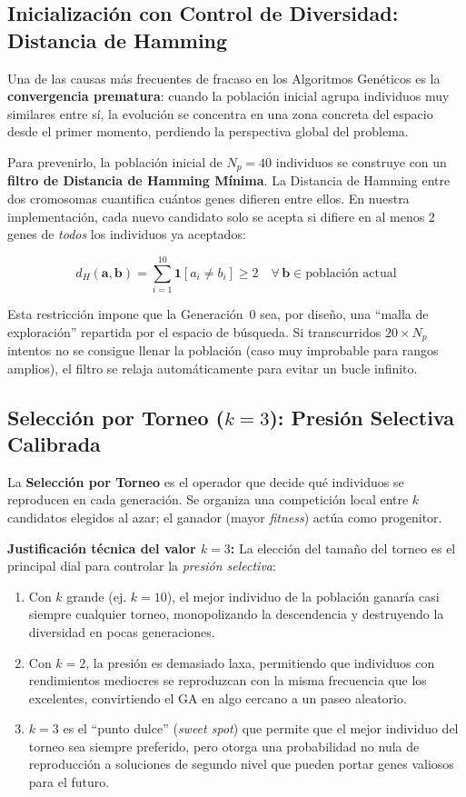 \documentclass[12pt, a4paper]{article}
\begin{document}
\subsection{Inicialización con Control de Diversidad: Distancia de Hamming}

Una de las causas más frecuentes de fracaso en los Algoritmos Genéticos es la
\textbf{convergencia prematura}: cuando la población inicial agrupa individuos muy
similares entre sí, la evolución se concentra en una zona concreta del espacio
desde el primer momento, perdiendo la perspectiva global del problema.

Para prevenirlo, la población inicial de $N_p = 40$ individuos se construye con un
\textbf{filtro de Distancia de Hamming Mínima}. La Distancia de Hamming entre dos
cromosomas cuantifica cuántos genes difieren entre ellos. En nuestra implementación,
cada nuevo candidato solo se acepta si difiere en al menos 2 genes de
\textit{todos} los individuos ya aceptados:

\begin{equation}
  d_H(\mathbf{a}, \mathbf{b}) = \sum_{i=1}^{10} \mathbf{1}[a_i \neq b_i] \geq 2
  \quad \forall \, \mathbf{b} \in \text{población actual}
\end{equation}

Esta restricción impone que la Generación~0 sea, por diseño, una ``malla de exploración''
repartida por el espacio de búsqueda. Si transcurridos $20 \times N_p$ intentos no se
consigue llenar la población (caso muy improbable para rangos amplios), el filtro se
relaja automáticamente para evitar un bucle infinito.

\subsection{Selección por Torneo ($k=3$): Presión Selectiva Calibrada}

La \textbf{Selección por Torneo} es el operador que decide qué individuos se reproducen
en cada generación. Se organiza una competición local entre $k$ candidatos elegidos al
azar; el ganador (mayor \textit{fitness}) actúa como progenitor.

\textbf{Justificación técnica del valor $k=3$:} La elección del tamaño del torneo es
el principal dial para controlar la \textit{presión selectiva}:
\begin{enumerate}
  \item Con $k$ grande (ej. $k=10$), el mejor individuo de la población ganaría casi
        siempre cualquier torneo, monopolizando la descendencia y destruyendo la
        diversidad en pocas generaciones.
  \item Con $k=2$, la presión es demasiado laxa, permitiendo que individuos con
        rendimientos mediocres se reproduzcan con la misma frecuencia que los excelentes,
        convirtiendo el GA en algo cercano a un paseo aleatorio.
  \item $k=3$ es el ``punto dulce'' (\textit{sweet spot}) que permite que el mejor
        individuo del torneo sea siempre preferido, pero otorga una probabilidad
        no nula de reproducción a soluciones de segundo nivel que pueden portar
        genes valiosos para el futuro.
\end{enumerate}
\end{document}
